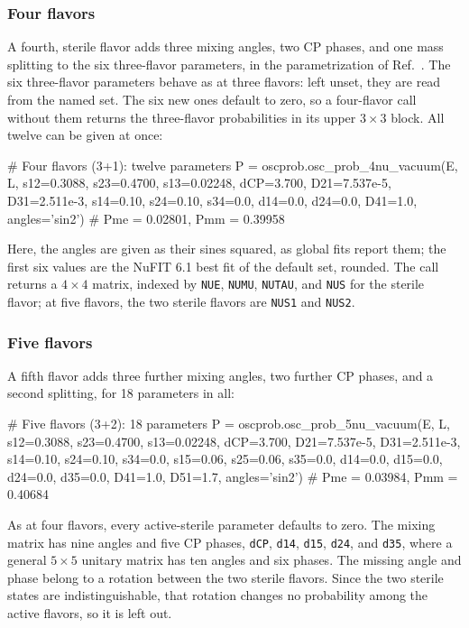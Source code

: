 \documentclass[final,5p,times,twocolumn,sort,compress]{elsarticle}
\makeatletter
\DeclareRobustCommand{\_}{%
  \ifmmode\nfss@text{\textunderscore}\else\textunderscore\allowbreak\fi}
\makeatother
\begin{document}
\subsubsection{Four flavors}
\label{sec:four_flavors}

A fourth, sterile flavor adds three mixing angles, two CP phases, and one mass splitting to the six three-flavor parameters, in the parametrization of Ref.~\cite{Bustamante:2019ggq}. The six three-flavor parameters behave as at three flavors: left unset, they are read from the named set. The six new ones default to zero, so a four-flavor call without them returns the three-flavor probabilities in its upper $3 \times 3$ block. All twelve can be given at once:
\begin{pysnip}
# Four flavors (3+1): twelve parameters
P = oscprob.osc_prob_4nu_vacuum(E, L,
 s12=0.3088, s23=0.4700, s13=0.02248,
 dCP=3.700, D21=7.537e-5, D31=2.511e-3,
 s14=0.10, s24=0.10, s34=0.0,
 d14=0.0, d24=0.0, D41=1.0,
 angles='sin2')
# Pme = 0.02801, Pmm = 0.39958
\end{pysnip}
Here, the angles are given as their sines squared, as global fits report them; the first six values are the NuFIT 6.1 best fit of the default set, rounded. The call returns a $4 \times 4$ matrix, indexed by {\tt NUE}, {\tt NUMU}, {\tt NUTAU}, and {\tt NUS} for the sterile flavor; at five flavors, the two sterile flavors are {\tt NUS1} and {\tt NUS2}.


\subsubsection{Five flavors}
\label{sec:five_flavors}

A fifth flavor adds three further mixing angles, two further CP phases, and a second splitting, for 18 parameters in all:
\begin{pysnip}
# Five flavors (3+2): 18 parameters
P = oscprob.osc_prob_5nu_vacuum(E, L,
 s12=0.3088, s23=0.4700, s13=0.02248,
 dCP=3.700, D21=7.537e-5, D31=2.511e-3,
 s14=0.10, s24=0.10, s34=0.0,
 s15=0.06, s25=0.06, s35=0.0,
 d14=0.0, d15=0.0, d24=0.0, d35=0.0,
 D41=1.0, D51=1.7, angles='sin2')
# Pme = 0.03984, Pmm = 0.40684
\end{pysnip}
As at four flavors, every active-sterile parameter defaults to zero. The mixing matrix has nine angles and five CP phases, {\tt dCP}, {\tt d14}, {\tt d15}, {\tt d24}, and {\tt d35}, where a general $5 \times 5$ unitary matrix has ten angles and six phases. The missing angle and phase belong to a rotation between the two sterile flavors. Since the two sterile states are indistinguishable, that rotation changes no probability among the active flavors, so it is left out.
\end{document}
